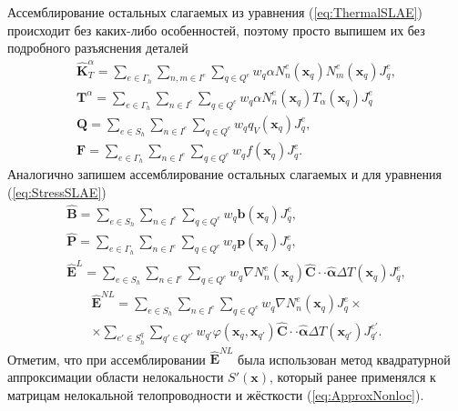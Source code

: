 Ассемблирование остальных слагаемых из уравнения (\ref{eq:ThermalSLAE}) происходит без каких-либо особенностей, поэтому просто выпишем их без подробного разъяснения деталей
\begin{gather}
	\label{eq:HeatTransferMatrix}
	\widehat{\textbf{K}}^{\alpha}_T =
	\sum\limits_{e \in \Gamma_h}
	\sum\limits_{n,m \in I^{e}}
	\sum\limits_{q \in Q^e}
	w_q \alpha N_n^e (\boldsymbol{x}_q) N_m^e (\boldsymbol{x}_q) J_q^e,
	\\
	\label{eq:HeatTransferVector}
	\textbf{T}^{\alpha} =
	\sum\limits_{e \in \Gamma_h}
	\sum\limits_{n \in I^{e}}
	\sum\limits_{q \in Q^e}
	w_q \alpha N_n^e (\boldsymbol{x}_q) T_{\alpha} (\boldsymbol{x}_q) J_q^e
	\\
	\label{eq:InnerFlux}
	\textbf{Q} =
	\sum\limits_{e \in S_h}
	\sum\limits_{n \in I^e}
	\sum\limits_{q \in Q^e}
	w_q q_V (\boldsymbol{x}_q) J_q^e,
	\\
	\label{eq:OuterFlux}
	\textbf{F} =
	\sum\limits_{e \in \Gamma_h}
	\sum\limits_{n \in I^e}
	\sum\limits_{q \in Q^e}
	w_q f (\boldsymbol{x}_q) J_q^e.
\end{gather}
Аналогично запишем ассемблирование остальных слагаемых и для уравнения (\ref{eq:StressSLAE})
\begin{gather}
	\label{eq:InnerPressure}
	\widehat{\textbf{B}} =
	\sum\limits_{e \in S_h}
	\sum\limits_{n \in I^e}
	\sum\limits_{q \in Q^e}
	w_q \boldsymbol{b} (\boldsymbol{x}_q) J_q^e,
	\\
	\label{eq:OuterPressure}
	\widehat{\textbf{P}} = 
	\sum\limits_{e \in \Gamma_h}
	\sum\limits_{n \in I^e}
	\sum\limits_{q \in Q^e}
	w_q \boldsymbol{p} (\boldsymbol{x}_q) J_q^e,
	\\
	\label{eq:LocalThermalExpansion}
	\widehat{\textbf{E}}^L = 
	\sum\limits_{e \in S_h}
	\sum\limits_{n \in I^e}
	\sum\limits_{q \in Q^e}
	w_q \nabla N_n^e (\boldsymbol{x}_q) \widehat{\mathbf{C}} \cdot \cdot \widehat{\boldsymbol{\alpha}} \Delta T (\boldsymbol{x}_q) J_q^e,
\end{gather}
\begin{multline}
	\label{eq:NonLocalThermalExpansion}
	\widehat{\textbf{E}}^{NL} = 
	\sum\limits_{e \in S_h}
	\sum\limits_{n \in I^e}
	\sum\limits_{q \in Q^e}
	w_q \nabla N_n^e (\boldsymbol{x}_q) J_q^e 
	\times \\ \times
	\sum\limits_{e' \in S_h^q}
	\sum\limits_{q' \in Q^{e'}}
	w_{q'} \varphi (\boldsymbol{x}_q, \boldsymbol{x}_{q'}) \widehat{\mathbf{C}} \cdot \cdot \widehat{\boldsymbol{\alpha}} \Delta T (\boldsymbol{x}_{q'}) J_{q'}^{e'}.
\end{multline}
Отметим, что при ассемблировании $\widehat{\textbf{E}}^{NL}$ была использован метод квадратурной аппроксимации области нелокальности $S'(\boldsymbol{x})$, который ранее применялся к матрицам нелокальной телопроводности и жёсткости (\ref{eq:ApproxNonloc}).

